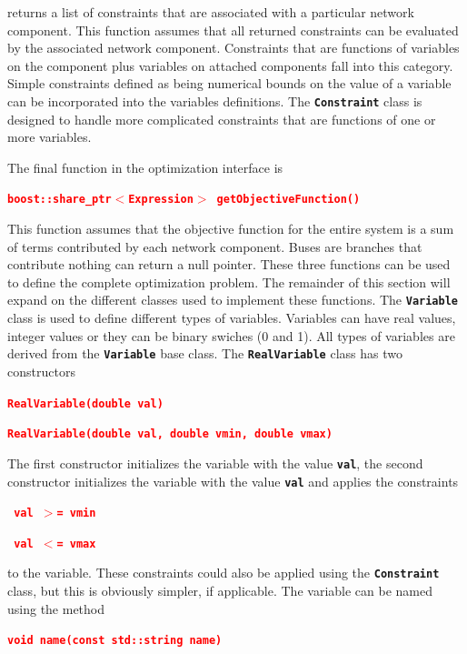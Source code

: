 \documentclass[12pt]{report} %
\begin{document}
returns a list of constraints that are associated with a particular network component. This function assumes that all returned constraints can be evaluated by the associated network component. Constraints that are functions of variables on the component plus variables on attached components fall into this category. Simple constraints defined as being numerical bounds on the value of a variable can be incorporated into the variables definitions. The \texttt{\textbf{Constraint}} class is designed to handle more complicated constraints that are functions of one or more variables.

The final function in the optimization interface is

\textcolor{red}{\texttt{\textbf{boost::share\_ptr$\boldsymbol{\mathrm{<}}$Expression$\boldsymbol{\mathrm{>}}$ getObjectiveFunction()}}}

This function assumes that the objective function for the entire system is a sum of terms contributed by each network component. Buses are branches that contribute nothing can return a null pointer. These three functions can be used to define the complete optimization problem. The remainder of this section will expand on the different classes used to implement these functions.
The \texttt{\textbf{Variable}} class is used to define different types of variables. Variables can have real values, integer values or they can be binary swiches (0 and 1). All types of variables are derived from the \texttt{\textbf{Variable}} base class. The \texttt{\textbf{RealVariable}} class has two constructors

\textcolor{red}{\texttt{\textbf{RealVariable(double val)}}}

\textcolor{red}{\texttt{\textbf{RealVariable(double val, double vmin, double vmax)}}}

The first constructor initializes the variable with the value \texttt{\textbf{val}}, the second constructor initializes the variable with the value \texttt{\textbf{val}} and applies the constraints

\textcolor{red}{\texttt{\textbf{    val $\boldsymbol{\mathrm{>}}$= vmin}}}

\textcolor{red}{\texttt{\textbf{    val $\boldsymbol{\mathrm{<}}$= vmax}}}

to the variable. These constraints could also be applied using the \texttt{\textbf{Constraint}} class, but this is obviously simpler, if applicable. The variable can be named using the method

\textcolor{red}{\texttt{\textbf{void name(const std::string name)}}}
\end{document}
